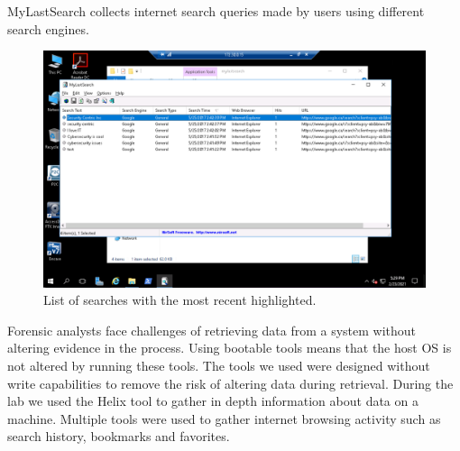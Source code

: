 MyLastSearch collects internet search queries made by users using different search engines.
\begin{figure}[H]
    \centering
    \includegraphics[width=\linewidth]{figures/Part 2 Step 25.png}
    \caption{List of searches with the most recent highlighted.}
\end{figure}



Forensic analysts face challenges of retrieving data from a system without altering evidence in the process.
Using bootable tools means that the host OS is not altered by running these tools.
The tools we used were designed without write capabilities to remove the risk of altering data during retrieval.
During the lab we used the Helix tool to gather in depth information about data on a machine.
Multiple tools were used to gather internet browsing activity such as search history, bookmarks and favorites.